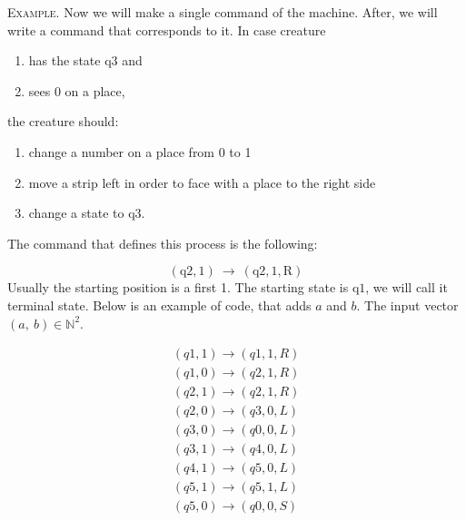 \documentclass{beamer}
\begin{document}
\begin{frame}
\textsc{Example.} Now we will make a single command of the machine. After, we will write a command that corresponds to it. In case creature
\begin{enumerate}
\item has the state $\mathrm{q}3$ and \item sees 0 on a place,
\end{enumerate}

the creature should: 
\begin{enumerate}
\item change a number on a place from 0 to 1 \item move a strip left in order to face with a place to the right side \item change a state to $\mathrm{q}3$. 
\end{enumerate}

\end{frame}

\begin{frame}
The command that defines this process is the following:

{\large $$(\mathrm{q}2, 1)\ \rightarrow\ (\mathrm{q}2, 1, \mathrm{R})$$}
Usually the starting position is a first 1. The starting state is $\mathrm{q}1$, we will call it terminal state.
Below is an example of code, that adds $a$ and $b$. The input vector $(a,\ b)\in\mathbb{N}^2$.
\end{frame}


\begin{frame}

\begin{align*}
(q1, 1) \rightarrow (q1, 1, R)\\
(q1, 0) \rightarrow (q2, 1, R)\\
(q2, 1) \rightarrow (q2, 1, R)\\
(q2, 0) \rightarrow (q3, 0, L)\\
(q3, 0) \rightarrow (q0, 0, L)\\
(q3, 1) \rightarrow (q4, 0, L)\\
(q4, 1) \rightarrow (q5, 0, L)\\
(q5, 1) \rightarrow (q5, 1, L)\\
(q5, 0) \rightarrow (q0, 0, S)\\
\end{align*}

\end{frame}
\end{document}

